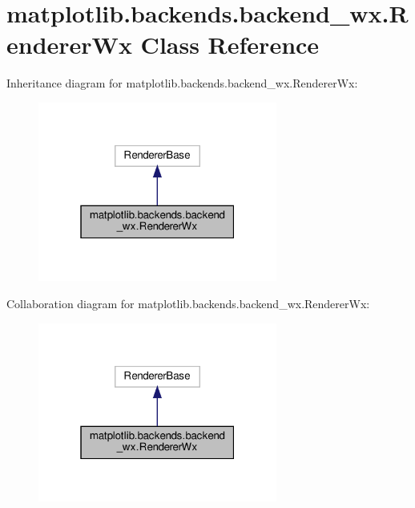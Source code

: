 \hypertarget{classmatplotlib_1_1backends_1_1backend__wx_1_1RendererWx}{}\section{matplotlib.\+backends.\+backend\+\_\+wx.\+Renderer\+Wx Class Reference}
\label{classmatplotlib_1_1backends_1_1backend__wx_1_1RendererWx}


Inheritance diagram for matplotlib.\+backends.\+backend\+\_\+wx.\+Renderer\+Wx\+:
\nopagebreak
\begin{figure}[H]
\begin{center}
\leavevmode
\includegraphics[width=223pt]{classmatplotlib_1_1backends_1_1backend__wx_1_1RendererWx__inherit__graph}
\end{center}
\end{figure}


Collaboration diagram for matplotlib.\+backends.\+backend\+\_\+wx.\+Renderer\+Wx\+:
\nopagebreak
\begin{figure}[H]
\begin{center}
\leavevmode
\includegraphics[width=223pt]{classmatplotlib_1_1backends_1_1backend__wx_1_1RendererWx__coll__graph}
\end{center}
\end{figure}

